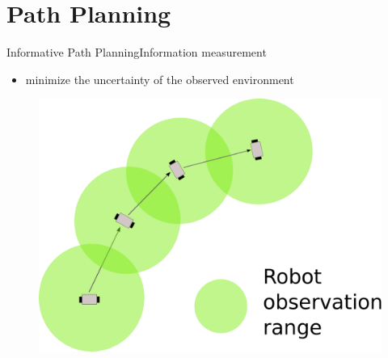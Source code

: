 \section{Path Planning}

\begin{frame}{Informative Path Planning}{Information measurement}
\begin{itemize}
\item minimize the uncertainty of the observed environment
\end{itemize}
\begin{figure}
	\centering
	\includegraphics[width = .6\textwidth]{./figure/robotObservation}
\end{figure}
\end{frame}

